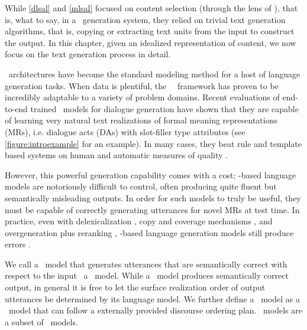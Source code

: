 While \autoref{dlsal} and \autoref{mlsal} focused on content selection
(through the lens of \salienceestimation), that is, what to say, in
a \texttotext~generation system, they relied on trivial text generation
algorithms, that is, copying or extracting text units from the input to
construct the output. In this chapter, given an idealized representation
of content, we now focus on the text generation process in detail. 




\Deeplearning~architectures have become the standard modeling 
method for a host
of language generation tasks. When data is plentiful, 
the \deeplearning~\sequencetosequence~framework
has proven to be incredibly adaptable to a variety of problem domains. 
Recent evaluations of end-to-end
trained \deeplearning~models for dialogue generation have shown that they 
are capable of learning very natural text realizations of formal
meaning representations (MRs),
i.e. dialogue acts (DAs) with slot-filler type attributes
(see \autoref{figure:introexample} for an
example).
In many cases,
they  beat rule and 
template based
systems on human and automatic measures of quality \cite{duvsek2019evaluating}.
  
%

However, this powerful generation capability comes with a cost; 
\deeplearning-based language
models are notoriously difficult to control, often producing quite 
fluent but  semantically misleading outputs. 
In order 
    for such models to truly be useful, they must be capable
    of correctly generating utterances for novel MRs at test time. 
In practice,
   even with delexicalization \cite{duvsek2016sequence,juraskaslug2slug}, 
copy and coverage mechanisms \cite{elder2018e2e}, 
    and overgeneration plus reranking \cite{duvsek2016sequence,juraskaslug2slug}, \deeplearning-based language generation models still produce 
errors \cite{duvsek2019evaluating}.


We call a \naturallanguagegeneration~model that generates utterances 
that are semantically correct with respect to the input 
\meaningrepresentation~a \faithfulgeneration~model. While a
\faithfulgeneration~model produces semantically correct output, in general
it is free to let the surface realization order of output utterances
be determined by its language model. We further define a 
\controllablegeneration~model as a \naturallanguagegeneration~model that can
follow a externally provided discourse ordering plan. 
\Controllablegeneration~models are a subset of \faithfulgeneration~models.

